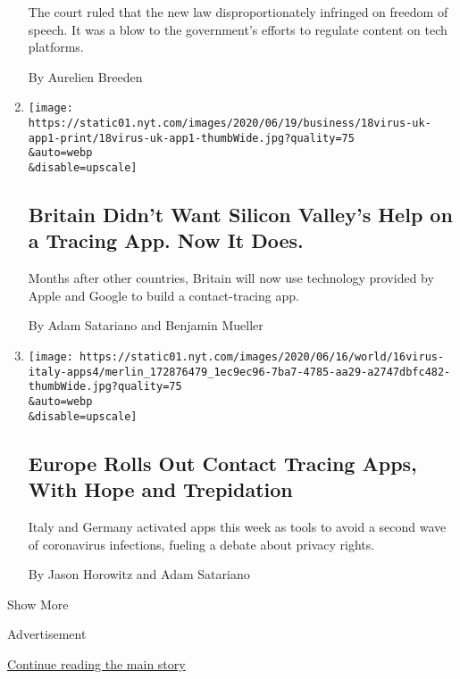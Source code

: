 \begin{enumerate}
  The court ruled that the new law disproportionately infringed on
  freedom of speech. It was a blow to the government's efforts to
  regulate content on tech platforms.

  By Aurelien Breeden
\item
  \href{/2020/06/18/business/britain-contact-tracing-app.html}{}

  \texttt{[image: https://static01.nyt.com/images/2020/06/19/business/18virus-uk-app1-print/18virus-uk-app1-thumbWide.jpg?quality=75\\\&auto=webp\\\&disable=upscale]}

  \hypertarget{britain-didnt-want-silicon-valleys-help-on-a-tracing-app-now-it-does}{%
  \subsection{Britain Didn't Want Silicon Valley's Help on a Tracing
  App. Now It
  Does.}\label{britain-didnt-want-silicon-valleys-help-on-a-tracing-app-now-it-does}}

  Months after other countries, Britain will now use technology provided
  by Apple and Google to build a contact-tracing app.

  By Adam Satariano and Benjamin Mueller
\item
  \href{/2020/06/16/world/europe/contact-tracing-apps-europe-coronavirus.html}{}

  \texttt{[image: https://static01.nyt.com/images/2020/06/16/world/16virus-italy-apps4/merlin\_172876479\_1ec9ec96-7ba7-4785-aa29-a2747dbfc482-thumbWide.jpg?quality=75\\\&auto=webp\\\&disable=upscale]}

  \hypertarget{europe-rolls-out-contact-tracing-apps-with-hope-and-trepidation}{%
  \subsection{Europe Rolls Out Contact Tracing Apps, With Hope and
  Trepidation}\label{europe-rolls-out-contact-tracing-apps-with-hope-and-trepidation}}

  Italy and Germany activated apps this week as tools to avoid a second
  wave of coronavirus infections, fueling a debate about privacy rights.

  By Jason Horowitz and Adam Satariano
\end{enumerate}

Show More

Advertisement

\protect\hyperlink{after-mid2}{Continue reading the main story}

